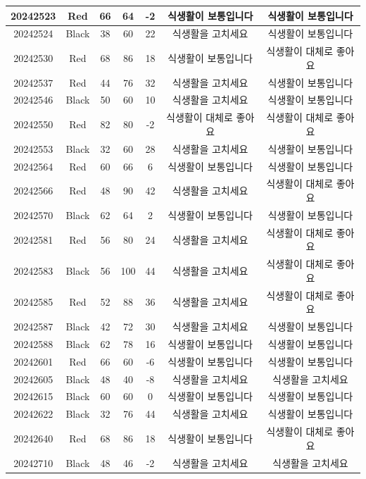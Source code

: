 \documentclass[
]{book}
\begin{document}
\begin{tabular}{c|c|c|c|c|c|c}
\hline
20242523 & Red & 66 & 64 & -2 & 식생활이 보통입니다 & 식생활이 보통입니다\\
\hline
20242524 & Black & 38 & 60 & 22 & 식생활을 고치세요 & 식생활이 보통입니다\\
\hline
20242530 & Red & 68 & 86 & 18 & 식생활이 보통입니다 & 식생활이 대체로 좋아요\\
\hline
20242537 & Red & 44 & 76 & 32 & 식생활을 고치세요 & 식생활이 보통입니다\\
\hline
20242546 & Black & 50 & 60 & 10 & 식생활을 고치세요 & 식생활이 보통입니다\\
\hline
20242550 & Red & 82 & 80 & -2 & 식생활이 대체로 좋아요 & 식생활이 대체로 좋아요\\
\hline
20242553 & Black & 32 & 60 & 28 & 식생활을 고치세요 & 식생활이 보통입니다\\
\hline
20242564 & Red & 60 & 66 & 6 & 식생활이 보통입니다 & 식생활이 보통입니다\\
\hline
20242566 & Red & 48 & 90 & 42 & 식생활을 고치세요 & 식생활이 대체로 좋아요\\
\hline
20242570 & Black & 62 & 64 & 2 & 식생활이 보통입니다 & 식생활이 보통입니다\\
\hline
20242581 & Red & 56 & 80 & 24 & 식생활을 고치세요 & 식생활이 대체로 좋아요\\
\hline
20242583 & Black & 56 & 100 & 44 & 식생활을 고치세요 & 식생활이 대체로 좋아요\\
\hline
20242585 & Red & 52 & 88 & 36 & 식생활을 고치세요 & 식생활이 대체로 좋아요\\
\hline
20242587 & Black & 42 & 72 & 30 & 식생활을 고치세요 & 식생활이 보통입니다\\
\hline
20242588 & Black & 62 & 78 & 16 & 식생활이 보통입니다 & 식생활이 보통입니다\\
\hline
20242601 & Red & 66 & 60 & -6 & 식생활이 보통입니다 & 식생활이 보통입니다\\
\hline
20242605 & Black & 48 & 40 & -8 & 식생활을 고치세요 & 식생활을 고치세요\\
\hline
20242615 & Black & 60 & 60 & 0 & 식생활이 보통입니다 & 식생활이 보통입니다\\
\hline
20242622 & Black & 32 & 76 & 44 & 식생활을 고치세요 & 식생활이 보통입니다\\
\hline
20242640 & Red & 68 & 86 & 18 & 식생활이 보통입니다 & 식생활이 대체로 좋아요\\
\hline
20242710 & Black & 48 & 46 & -2 & 식생활을 고치세요 & 식생활을 고치세요\\
\hline

\end{tabular}
\end{document}
